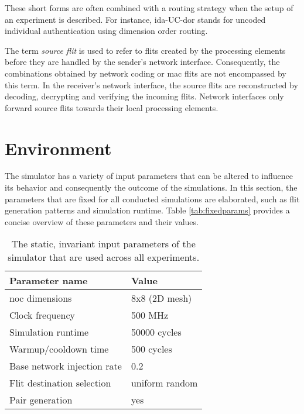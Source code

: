 These short forms are often combined with a routing strategy when the setup of an experiment is described. For instance, \gls{ida}-UC-\gls{dor} stands for uncoded
individual authentication using dimension order routing.

The term \textit{source flit} is used to refer to flits created by the processing elements before they are handled by the sender's network interface.
Consequently, the combinations obtained by network coding or \gls{mac} flits are not encompassed by this term. In the receiver's network interface,
the source flits are reconstructed by decoding, decrypting and verifying the incoming flits. Network interfaces only forward source flits towards
their local processing elements.

\section{Environment}\label{sec:environmenteval}
The simulator has a variety of input parameters that can be altered to influence its behavior and consequently the outcome of the simulations.
In this section, the parameters that are fixed for all conducted simulations are elaborated, such as flit generation patterns and simulation runtime. Table
\vref{tab:fixedparams} provides a concise overview of these parameters and their values.

\begin{table}
    \centering
    \begin{tabulary}{\textwidth}{L|L}
        Parameter name & Value \\\hline
        \Gls{noc} dimensions & 8x8 (2D mesh) \\
        Clock frequency & 500 MHz \\
        Simulation runtime & \num{50000} cycles \\
        Warmup/cooldown time & 500 cycles \\
        Base network injection rate & 0.2 \\
        Flit destination selection & uniform random \\
        Pair generation & yes \\
    \end{tabulary}
    \caption[Static input parameters for all simulations]{The static, invariant input parameters of the simulator that are used across all
    experiments.}
    \label{tab:fixedparams}
\end{table}

